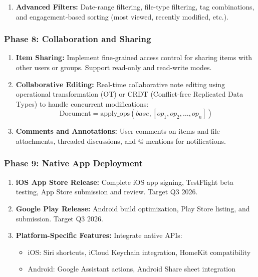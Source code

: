 \documentclass[10pt,twocolumn,a4paper]{article}
\begin{document}
\begin{table}[h]
\begin{enumerate}
\item \textbf{Advanced Filters:} Date-range filtering, file-type filtering, tag combinations,
  and engagement-based sorting (most viewed, recently modified, etc.).

\end{enumerate}

\subsubsection{Phase 8: Collaboration and Sharing}

\begin{enumerate}

\item \textbf{Item Sharing:} Implement fine-grained access control for sharing items with
  other users or groups. Support read-only and read-write modes.

\item \textbf{Collaborative Editing:} Real-time collaborative note editing using operational
  transformation (OT) or CRDT (Conflict-free Replicated Data Types) to handle concurrent
  modifications:
  \begin{equation}
    \text{Document} = \text{apply\_ops}(base, [op_1, op_2, \ldots, op_n])
  \end{equation}

\item \textbf{Comments and Annotations:} User comments on items and file attachments,
  threaded discussions, and @ mentions for notifications.

\end{enumerate}

\subsubsection{Phase 9: Native App Deployment}

\begin{enumerate}

\item \textbf{iOS App Store Release:} Complete iOS app signing, TestFlight beta testing, App
  Store submission and review. Target Q3 2026.

\item \textbf{Google Play Release:} Android build optimization, Play Store listing, and
  submission. Target Q3 2026.

\item \textbf{Platform-Specific Features:} Integrate native APIs:
  \begin{itemize}
    \item iOS: Siri shortcuts, iCloud Keychain integration, HomeKit compatibility
    \item Android: Google Assistant actions, Android Share sheet integration
  \end{itemize}


\end{enumerate}
\end{table}
\end{document}
